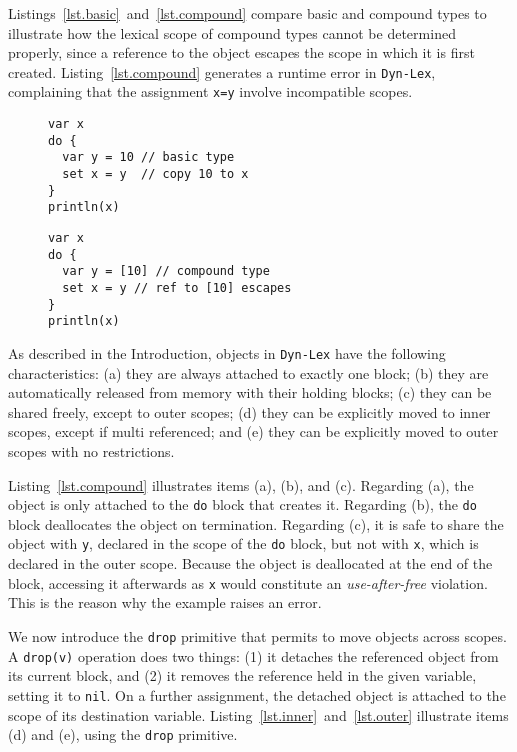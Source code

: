 \documentclass[12pt]{article}
\newcommand{\code}[1] {\texttt{\footnotesize{#1}}}
\newcommand{\lex} {\texttt{Dyn-Lex}\xspace}
\begin{document}
Listings~\ref{lst.basic}~and~\ref{lst.compound} compare basic and compound
types to illustrate how the lexical scope of compound types cannot be
determined properly, since a reference to the object escapes the scope in which
it is first created.
Listing~\ref{lst.compound} generates a runtime error in \lex, complaining that
the assignment \code{x=y} involve incompatible scopes.

\begin{figure}
\begin{minipage}[t]{0.5\textwidth}
\begin{lstlisting}[caption=Basic type escape., label=lst.basic]
var x
do {
  var y = 10 // basic type
  set x = y  // copy 10 to x
}
println(x)
\end{lstlisting}
\end{minipage}
\begin{minipage}[t]{0.5\textwidth}
\begin{lstlisting}[caption=Compound type escape., label=lst.compound]
var x
do {
  var y = [10] // compound type
  set x = y // ref to [10] escapes
}
println(x)
\end{lstlisting}
\end{minipage}
\end{figure}

As described in the Introduction, objects in \lex have the following
characteristics:
    (a) they are always attached to exactly one block;
    (b) they are automatically released from memory with their holding blocks;
    (c) they can be shared freely, except to outer scopes;
    (d) they can be explicitly moved to inner scopes, except if multi
        referenced; and
    (e) they can be explicitly moved to outer scopes with no restrictions.

Listing~\ref{lst.compound} illustrates items (a), (b), and (c).
Regarding (a), the object is only attached to the \code{do} block that
creates it.
Regarding (b), the \code{do} block deallocates the object on termination.
Regarding (c), it is safe to share the object with \code{y}, declared in the
scope of the \code{do} block, but not with \code{x}, which is declared in the
outer scope.
Because the object is deallocated at the end of the block, accessing it
afterwards as \code{x} would constitute an \emph{use-after-free} violation.
This is the reason why the example raises an error.

We now introduce the \code{drop} primitive that permits to move objects across
scopes.
A \code{drop(v)} operation does two things:
    (1) it detaches the referenced object from its current block, and
    (2) it removes the reference held in the given variable, setting it to
        \code{nil}.
On a further assignment, the detached object is attached to the scope of its
destination variable.
%
Listing~\ref{lst.inner}~and~\ref{lst.outer} illustrate items (d) and (e),
using the \code{drop} primitive.
\end{document}
